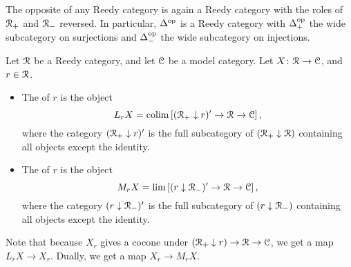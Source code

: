 \documentclass[main.tex]{subfiles}
\begin{document}
\begin{example}
  \label{eg:opposite_reedy_structure}
  The opposite of any Reedy category is again a Reedy category with the roles of $\mathcal{R}_{+}$ and $\mathcal{R}_{-}$ reversed. In particular, $\Delta^{\mathrm{op}}$ is a Reedy category with $\Delta^{\mathrm{op}}_{+}$ the wide subcategory on surjections and $\Delta^{\mathrm{op}}_{-}$ the wide subcategory on injections.
\end{example}

\begin{definition}
  Let $\mathcal{R}$ be a Reedy category, and let $\mathcal{C}$ be a model category. Let $X\colon \mathcal{R} \to \mathcal{C}$, and $r \in \mathcal{R}$.

  \begin{itemize}
    \item The  of $r$ is the object
      \begin{equation*}
        L_{r}X = \operatorname*{colim} \left[ (\mathcal{R}_{+} \downarrow r)' \to \mathcal{R} \to \mathcal{C} \right],
      \end{equation*}
      where the category $(\mathcal{R}_{+} \downarrow r)'$ is the full subcategory of $(\mathcal{R}_{+} \downarrow \mathcal{R})$ containing all objects except the identity.

    \item The  of $r$ is the object
      \begin{equation*}
        M_{r}X = \lim \left[ (r \downarrow \mathcal{R}_{-})' \to \mathcal{R} \to \mathcal{C} \right],
      \end{equation*}
      where the category $(r \downarrow \mathcal{R}_{-})'$ is the full subcategory of $(r \downarrow \mathcal{R}_{-})$ containing all objects except the identity.
  \end{itemize}
\end{definition}

Note that because $X_{r}$ gives a cocone under $(\mathcal{R}_{+} \downarrow r) \to \mathcal{R} \to \mathcal{C}$, we get a map $L_{r}X \to X_{r}$. Dually, we get a map $X_{r} \to M_{r}X$.
\end{document}
